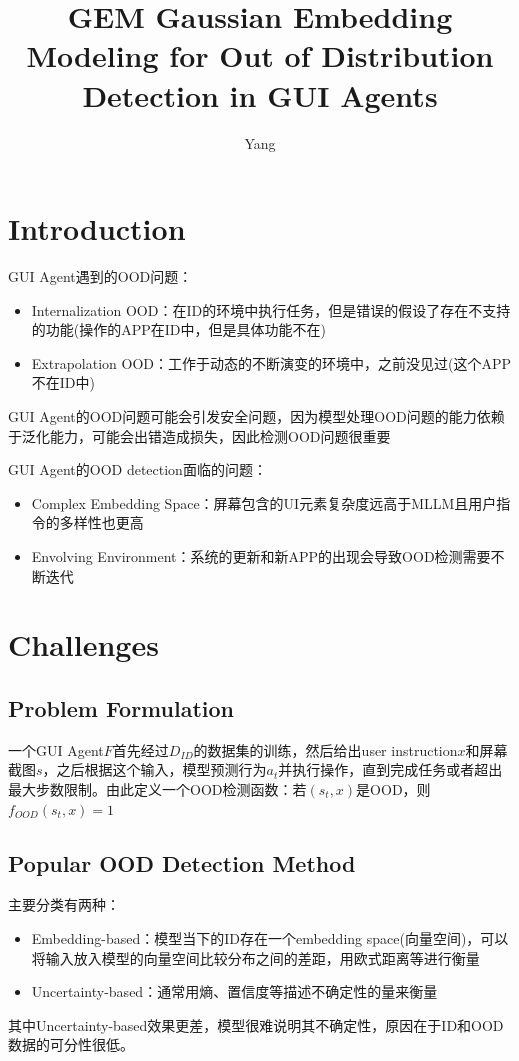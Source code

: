 \documentclass[a4paper,12pt]{article}
\title{GEM Gaussian Embedding Modeling for Out of Distribution Detection in GUI Agents}
\author{Yang}
\begin{document}
\maketitle
\section{Introduction}
GUI Agent遇到的OOD问题：
\begin{itemize}
    \item Internalization OOD：在ID的环境中执行任务，但是错误的假设了存在不支持的功能(操作的APP在ID中，但是具体功能不在)
    \item Extrapolation OOD：工作于动态的不断演变的环境中，之前没见过(这个APP不在ID中)
\end{itemize}

GUI Agent的OOD问题可能会引发安全问题，因为模型处理OOD问题的能力依赖于泛化能力，可能会出错造成损失，因此检测OOD问题很重要

GUI Agent的OOD detection面临的问题：
\begin{itemize}
    \item Complex Embedding Space：屏幕包含的UI元素复杂度远高于MLLM且用户指令的多样性也更高
    \item Envolving Environment：系统的更新和新APP的出现会导致OOD检测需要不断迭代
\end{itemize}

\section{Challenges}
\subsection{Problem Formulation}
一个GUI Agent$F$首先经过$D_{ID}$的数据集的训练，然后给出user instruction$x$和屏幕截图$s$，之后根据这个输入，模型预测行为$a_t$并执行操作，直到完成任务或者超出最大步数限制。由此定义一个OOD检测函数：若$(s_t, x)$是OOD，则$f_{OOD}(s_t, x) = 1$

\subsection{Popular OOD Detection Method}
主要分类有两种：
\begin{itemize}
    \item Embedding-based：模型当下的ID存在一个embedding space(向量空间)，可以将输入放入模型的向量空间比较分布之间的差距，用欧式距离等进行衡量
    \item Uncertainty-based：通常用熵、置信度等描述不确定性的量来衡量
\end{itemize}
其中Uncertainty-based效果更差，模型很难说明其不确定性，原因在于ID和OOD数据的可分性很低。
\end{document}
